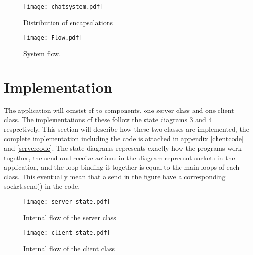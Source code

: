 \begin{figure}[H]
\centering
\texttt{[image: chatsystem.pdf]}
\caption{Distribution of encapsulations}
\label{fig:encapdistr}
\end{figure}

\begin{figure}[H]
\centering
\texttt{[image: Flow.pdf]}
\caption{System flow.}
\label{fig:flow}
\end{figure}


\newpage

\section{Implementation}
The application will consist of to components, one server class and one client class. The implementations of these follow the state diagrams \ref{fig:server-state} and \ref{fig:client-state} respectively. This section will describe how these two classes are implemented, the complete implementation including the code is attached in appendix \ref{clientcode} and \ref{servercode}. The state diagrams represents exactly how the programs work together, the send and receive actions in the diagram represent sockets in the application, and the loop binding it together is equal to the main loops of each class. This eventually mean that a send in the figure have a corresponding socket.send() in the code.

\begin{figure}
\centering
\texttt{[image: server-state.pdf]}
\caption{Internal flow of the server class}
\label{fig:server-state}
\end{figure}


\begin{figure}
\centering
\texttt{[image: client-state.pdf]}
\caption{Internal flow of the client class}
\label{fig:client-state}
\end{figure}

